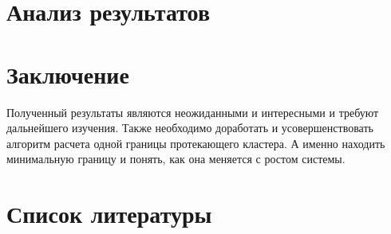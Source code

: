\documentclass[14pt]{article}
\begin{document}
\section{Анализ результатов}
\section{Заключение}
\par Полученный результаты являются неожиданными и интересными и требуют дальнейшего изучения. Также необходимо доработать и усовершенствовать алгоритм расчета одной границы протекающего кластера. А именно находить минимальную границу и понять, как она меняется с ростом системы.
\section{Список литературы}
\end{document}
